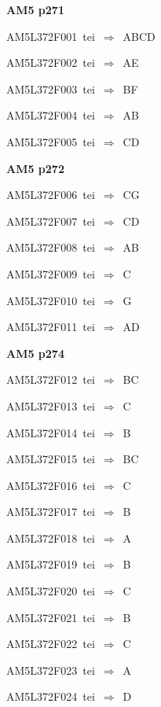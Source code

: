 \par\vfill\eject
{\bf\hfill AM5 p271\hfill\hbox{}}\par\bigskip
{\sixrm AM5L372F001\ {\sixit tei}\ }$\Rightarrow$\ ABCD\par\smallskip
{\sixrm AM5L372F002\ {\sixit tei}\ }$\Rightarrow$\ AE\par\smallskip
{\sixrm AM5L372F003\ {\sixit tei}\ }$\Rightarrow$\ BF\par\smallskip
{\sixrm AM5L372F004\ {\sixit tei}\ }$\Rightarrow$\ AB\par\smallskip
{\sixrm AM5L372F005\ {\sixit tei}\ }$\Rightarrow$\ CD\par\smallskip

\par\vfill\eject
{\bf\hfill AM5 p272\hfill\hbox{}}\par\bigskip
{\sixrm AM5L372F006\ {\sixit tei}\ }$\Rightarrow$\ CG\par\smallskip
{\sixrm AM5L372F007\ {\sixit tei}\ }$\Rightarrow$\ CD\par\smallskip
{\sixrm AM5L372F008\ {\sixit tei}\ }$\Rightarrow$\ AB\par\smallskip
{\sixrm AM5L372F009\ {\sixit tei}\ }$\Rightarrow$\ C\par\smallskip
{\sixrm AM5L372F010\ {\sixit tei}\ }$\Rightarrow$\ G\par\smallskip
{\sixrm AM5L372F011\ {\sixit tei}\ }$\Rightarrow$\ AD\par\smallskip

\par\vfill\eject
{\bf\hfill AM5 p274\hfill\hbox{}}\par\bigskip
{\sixrm AM5L372F012\ {\sixit tei}\ }$\Rightarrow$\ BC\par\smallskip
{\sixrm AM5L372F013\ {\sixit tei}\ }$\Rightarrow$\ C\par\smallskip
{\sixrm AM5L372F014\ {\sixit tei}\ }$\Rightarrow$\ B\par\smallskip
{\sixrm AM5L372F015\ {\sixit tei}\ }$\Rightarrow$\ BC\par\smallskip
{\sixrm AM5L372F016\ {\sixit tei}\ }$\Rightarrow$\ C\par\smallskip
{\sixrm AM5L372F017\ {\sixit tei}\ }$\Rightarrow$\ B\par\smallskip
{\sixrm AM5L372F018\ {\sixit tei}\ }$\Rightarrow$\ A\par\smallskip
{\sixrm AM5L372F019\ {\sixit tei}\ }$\Rightarrow$\ B\par\smallskip
{\sixrm AM5L372F020\ {\sixit tei}\ }$\Rightarrow$\ C\par\smallskip
{\sixrm AM5L372F021\ {\sixit tei}\ }$\Rightarrow$\ B\par\smallskip
{\sixrm AM5L372F022\ {\sixit tei}\ }$\Rightarrow$\ C\par\smallskip
{\sixrm AM5L372F023\ {\sixit tei}\ }$\Rightarrow$\ A\par\smallskip
{\sixrm AM5L372F024\ {\sixit tei}\ }$\Rightarrow$\ D\par\smallskip

